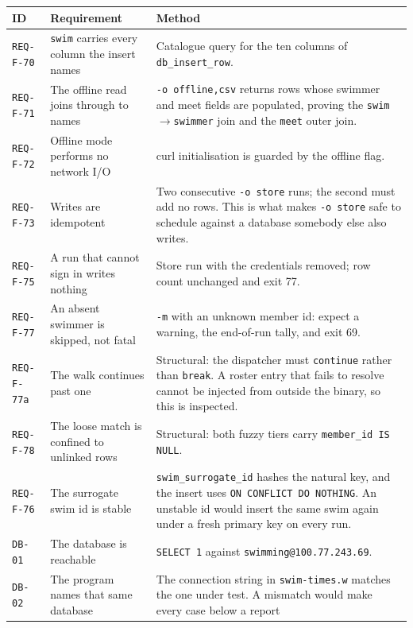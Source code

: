 \documentclass[12pt]{article}
\newcommand{\code}[1]{\texttt{#1}}
\newcommand{\req}[1]{\texttt{#1}}
\begin{document}
\begin{center}
\begin{longtable}{p{2.1cm}p{5.2cm}p{6.2cm}}
  \toprule
  \textbf{ID} & \textbf{Requirement} & \textbf{Method} \\
  \midrule\endhead
  \req{REQ-F-70} & \code{swim} carries every column the insert names
    & Catalogue query for the ten columns of
      \code{db\_insert\_row}. \\
  \req{REQ-F-71} & The offline read joins through to names
    & \code{-o offline,csv} returns rows whose swimmer and meet fields
      are populated, proving the \code{swim}$\to$\code{swimmer} join
      and the \code{meet} outer join. \\
  \req{REQ-F-72} & Offline mode performs no network I/O
    & curl initialisation is guarded by the offline flag. \\
  \req{REQ-F-73} & Writes are idempotent
    & Two consecutive \code{-o store} runs; the second must add no
      rows.  This is what makes \code{-o store} safe to schedule
      against a database somebody else also writes. \\
  \req{REQ-F-75} & A run that cannot sign in writes nothing
    & Store run with the credentials removed; row count unchanged and
      exit 77. \\
  \req{REQ-F-77} & An absent swimmer is skipped, not fatal
    & \code{-m} with an unknown member id: expect a warning, the
      end-of-run tally, and exit 69. \\
  \req{REQ-F-77a} & The walk continues past one
    & Structural: the dispatcher must \code{continue} rather than
      \code{break}.  A roster entry that fails to resolve cannot be
      injected from outside the binary, so this is inspected. \\
  \req{REQ-F-78} & The loose match is confined to unlinked rows
    & Structural: both fuzzy tiers carry \code{member\_id IS NULL}. \\
  \req{REQ-F-76} & The surrogate swim id is stable
    & \code{swim\_surrogate\_id} hashes the natural key, and the insert
      uses \code{ON CONFLICT DO NOTHING}.  An unstable id would insert
      the same swim again under a fresh primary key on every run. \\
  \midrule
  \req{DB-01} & The database is reachable
    & \code{SELECT 1} against
      \code{swimming@100.77.243.69}. \\
  \req{DB-02} & The program names that same database
    & The connection string in \code{swim-times.w} matches the one
      under test.  A mismatch would make every case below a report

\end{longtable}
\end{center}
\end{document}
